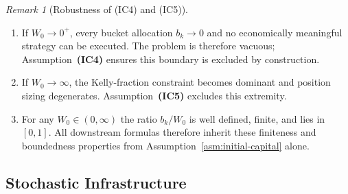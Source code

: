 \documentclass[12pt,openany]{book}
\numberwithin{equation}{chapter}
\theoremstyle{plain}
\theoremstyle{definition}
\theoremstyle{remark}
\newtheorem{remark}[theorem]{Remark}
\numberwithin{equation}{chapter}
\theoremstyle{plain}
\begin{document}
\begin{remark}[Robustness of (IC4) and (IC5)]
\label{rem:W0-boundary}
\begin{enumerate}[label=\textbf{(R\arabic*)}]
  \item If $W_0 \to 0^{+}$, every bucket allocation $b_k \to 0$ and
        no economically meaningful strategy can be executed.  The
        problem is therefore vacuous; Assumption~\textbf{(IC4)} ensures
        this boundary is excluded by construction.
  \item If $W_0 \to \infty$, the Kelly-fraction constraint becomes
        dominant and position sizing degenerates.
        Assumption~\textbf{(IC5)} excludes this extremity.
  \item For any $W_0 \in (0, \infty)$ the ratio $b_k / W_0$ is well
        defined, finite, and lies in $[0,1]$.  All downstream formulas
        therefore inherit these finiteness and boundedness properties
        from Assumption~\ref{asm:initial-capital} alone.
\end{enumerate}
\end{remark}

\subsection{Stochastic Infrastructure}
\end{document}
